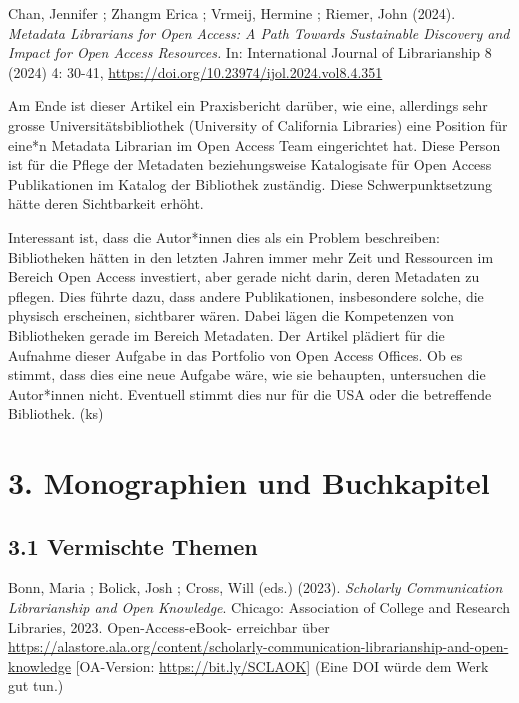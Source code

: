 \documentclass[a4paper,
fontsize=11pt,
oneside,
numbers=noperiodatend,
parskip=half-,
bibliography=totoc,
final
]{scrartcl}
\begin{document}
Chan, Jennifer ; Zhangm Erica ; Vrmeij, Hermine ; Riemer, John (2024).
\emph{Metadata Librarians for Open Access: A Path Towards Sustainable
Discovery and Impact for Open Access Resources.} In: International
Journal of Librarianship 8 (2024) 4: 30-41,
\url{https://doi.org/10.23974/ijol.2024.vol8.4.351}

Am Ende ist dieser Artikel ein Praxisbericht darüber, wie eine,
allerdings sehr grosse Universitätsbibliothek (University of California
Libraries) eine Position für eine*n Metadata Librarian im Open Access
Team eingerichtet hat. Diese Person ist für die Pflege der Metadaten
beziehungsweise Katalogisate für Open Access Publikationen im Katalog
der Bibliothek zuständig. Diese Schwerpunktsetzung hätte deren
Sichtbarkeit erhöht.

Interessant ist, dass die Autor*innen dies als ein Problem beschreiben:
Bibliotheken hätten in den letzten Jahren immer mehr Zeit und Ressourcen
im Bereich Open Access investiert, aber gerade nicht darin, deren
Metadaten zu pflegen. Dies führte dazu, dass andere Publikationen,
insbesondere solche, die physisch erscheinen, sichtbarer wären. Dabei
lägen die Kompetenzen von Bibliotheken gerade im Bereich Metadaten. Der
Artikel plädiert für die Aufnahme dieser Aufgabe in das Portfolio von
Open Access Offices. Ob es stimmt, dass dies eine neue Aufgabe wäre, wie
sie behaupten, untersuchen die Autor*innen nicht. Eventuell stimmt dies
nur für die USA oder die betreffende Bibliothek. (ks)

\hypertarget{monographien-und-buchkapitel}{%
\section{3. Monographien und
Buchkapitel}\label{monographien-und-buchkapitel}}

\hypertarget{vermischte-themen-1}{%
\subsection{3.1 Vermischte Themen}\label{vermischte-themen-1}}

Bonn, Maria ; Bolick, Josh ; Cross, Will (eds.) (2023). \emph{Scholarly
Communication Librarianship and Open Knowledge}. Chicago: Association of
College and Research Libraries, 2023. Open-Access-eBook- erreichbar über
\url{https://alastore.ala.org/content/scholarly-communication-librarianship-and-open-knowledge}
{[}OA-Version: \url{https://bit.ly/SCLAOK}{]} (Eine DOI würde dem Werk
gut tun.)
\end{document}
